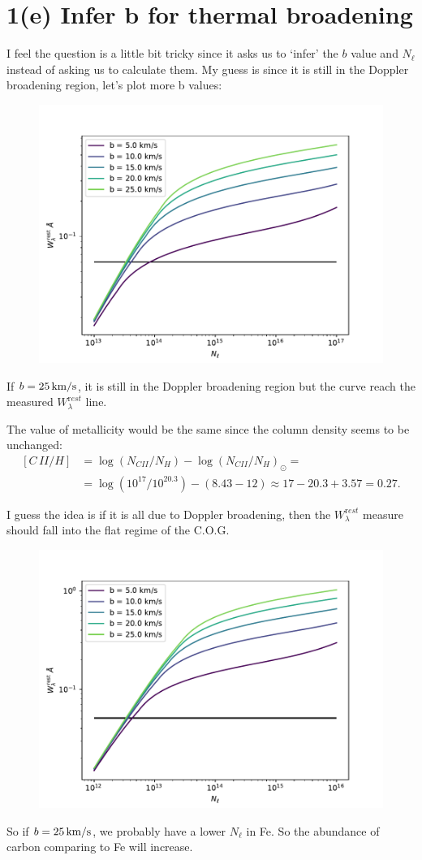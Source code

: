 \documentclass[12pt,letterpaper]{article}
\newcommand{\mt}{\mathrm}
\newcommand{\EWrest}{W^{\mt rest}_\lambda}
\newcommand{\columndensity}{N_\ell}
\newcommand{\kms}{\textrm{\,km/s}}
\begin{document}
\section*{1(e) Infer b for thermal broadening}
I feel the question is a little bit tricky since it asks us to `infer' the $b$ value and $\columndensity$ instead of asking us to calculate them.
My guess is since it is still in the Doppler broadening region, let's plot more b values:
\begin{figure}[H]
    \centering
    \includegraphics[width=0.75\columnwidth]{images/Wl_N_C_II_more_b.pdf}
\end{figure}
If $b = 25 \kms$, it is still in the Doppler broadening region but the curve reach the measured $\EWrest$ line.

The value of metallicity would be the same since the column density seems to be unchanged:
\begin{equation*}
    \begin{split}
        [C\,II/H] &= 
        \log{(N_{CII} / N_H)} - \log{(N_{CII} / N_H)}_\odot =\\
        &= \log{(10^{17} / 10^{20.3})} - ( 8.43 - 12 ) \approx 
        17 - 20.3 + 3.57 = 0.27.                
    \end{split}
\end{equation*}

I guess the idea is if it is all due to Doppler broadening, then the $\EWrest$ measure should fall into the flat regime of the C.O.G.
\begin{figure}
    \centering
    \includegraphics[width=0.75\columnwidth]{images/Wl_N_Fe_II_1_more_b.pdf}
\end{figure}
So if $b = 25 \kms$, we probably have a lower $\columndensity$ in Fe.
So the abundance of carbon comparing to Fe will increase.
\end{document}
